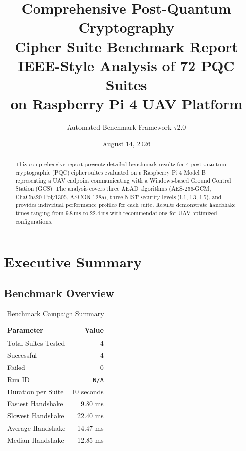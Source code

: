 \documentclass[11pt,a4paper,twoside]{article}
\title{\textbf{Comprehensive Post-Quantum Cryptography\\Cipher Suite Benchmark Report}\\[0.5em]
\large IEEE-Style Analysis of 72 PQC Suites\\on Raspberry Pi 4 UAV Platform}
\author{Automated Benchmark Framework v2.0}
\date{August 14, 2026}
\begin{document}
\maketitle

\begin{abstract}
This comprehensive report presents detailed benchmark results for 4 post-quantum 
cryptographic (PQC) cipher suites evaluated on a Raspberry Pi 4 Model B representing a UAV endpoint 
communicating with a Windows-based Ground Control Station (GCS). The analysis covers three AEAD 
algorithms (AES-256-GCM, ChaCha20-Poly1305, ASCON-128a), three NIST security levels (L1, L3, L5), 
and provides individual performance profiles for each suite. Results demonstrate handshake times 
ranging from 9.8\,ms to 22.4\,ms with 
recommendations for UAV-optimized configurations.
\end{abstract}

\tableofcontents
\listoffigures
\listoftables
\newpage

\section{Executive Summary}

\subsection{Benchmark Overview}

\begin{table}[H]
\centering
\caption{Benchmark Campaign Summary}
\begin{tabular}{l r}
\toprule
\textbf{Parameter} & \textbf{Value} \\
\midrule
Total Suites Tested & 4 \\
Successful & 4 \\
Failed & 0 \\
Run ID & \texttt{N/A} \\
Duration per Suite & 10 seconds \\
\midrule
Fastest Handshake & 9.80 ms \\
Slowest Handshake & 22.40 ms \\
Average Handshake & 14.47 ms \\
Median Handshake & 12.85 ms \\
\bottomrule
\end{tabular}
\end{table}
\end{document}
